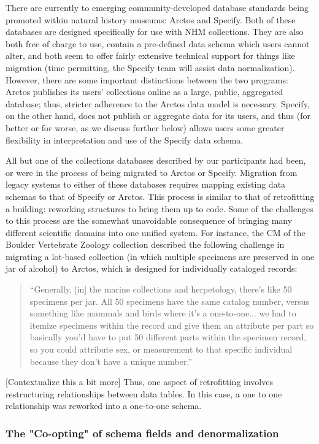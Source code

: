 There are currently to emerging community-developed database standards being promoted within natural history museums: Arctos and Specify. Both of these databases are designed specifically for use with NHM collections. They are also both free of charge to use, contain a pre-defined data schema which users cannot alter, and both seem to offer fairly extensive technical support for things like migration (time permitting, the Specify team will assist data normalization). However, there are some important distinctions between the two programs: Arctos publishes its users’ collections online as a large, public, aggregated database; thus, stricter adherence to the Arctos data model is necessary. Specify, on the other hand, does not publish or aggregate data for its users, and thus (for better or for worse, as we discuss further below) allows users some greater flexibility in interpretation and use of the Specify data schema. 

All but one of the collections databases described by our participants had been, or were in the process of being migrated to Arctos or Specify. Migration from legacy systems to either of these databases requires mapping existing data schemas to that of Specify or Arctos. This process is similar to that of retrofitting a building: reworking structures to bring them up to code. Some of the challenges to this process are the somewhat unavoidable consequence of bringing many different scientific domains into one unified system. For instance, the CM of the Boulder Vertebrate Zoology collection described the following challenge in migrating a lot-based collection (in which multiple specimens are preserved in one jar of alcohol) to Arctos, which is designed for individually cataloged records:
\begin{quote}
“Generally, [in] the marine collections and herpetology, there's like 50 specimens per jar. All 50 specimens have the same catalog number, versus something like mammals and birds where it's a one-to-one... we had to itemize specimens within the record and give them an attribute per part so basically you'd have to put 50 different parts within the specimen record, so you could attribute sex, or measurement to that specific individual because they don't have a unique number.”
\end{quote}
[Contextualize this a bit more]
Thus, one aspect of retrofitting involves restructuring relationships between data tables.  In this case, a one to one relationship was reworked into a one-to-one schema.

\subsubsection{The "Co-opting" of schema fields and denormalization }

